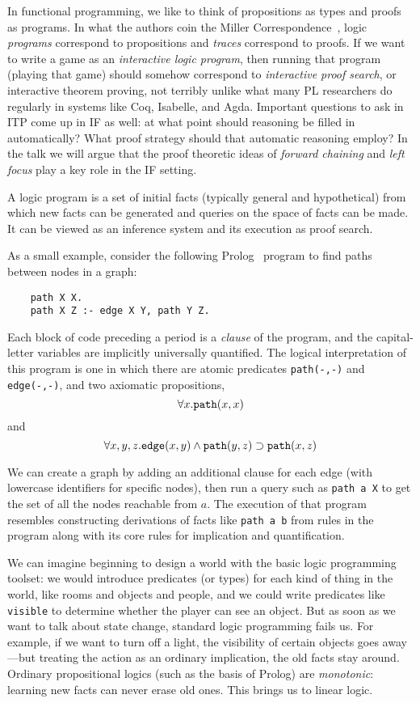 \renewcommand{\implies}{\supset}

In functional programming, we like to think of propositions as
types and proofs as programs. In what the authors coin the Miller
Correspondence~\cite{millertalk}, logic {\em programs} correspond to propositions
and {\em traces} correspond to proofs. If we want to write a game as an
{\em interactive logic program}, then running that program (playing that
game) should somehow correspond to {\em interactive proof search}, or
interactive theorem proving, not terribly unlike what many PL researchers
do regularly in systems like Coq, Isabelle, and Agda. Important questions
to ask in ITP come up in IF as well: at what point should reasoning be
filled in automatically? What proof strategy should that automatic
reasoning employ? In the talk we will argue that the proof theoretic
ideas of {\em forward chaining} and {\em left focus} play a key role in the
IF setting.

A logic program is a set of initial facts (typically general and
hypothetical) from which new facts can be generated and queries on the
space of facts can be made. It can be viewed as an inference system and its
execution as proof search.

As a small example, consider the following
Prolog~\cite{Covington:1996:PPD:230996} program to
find paths between nodes in a graph:

\begin{verbatim}
    path X X.
    path X Z :- edge X Y, path Y Z.
\end{verbatim}

\noindent
Each block of code preceding a period is a {\em clause} of the program, and
the capital-letter variables are implicitly universally quantified.
The logical interpretation of this program is one in which there are atomic
predicates \verb|path(-,-)| and \verb|edge(-,-)|, and two axiomatic
propositions, 
\[\forall x.\verb|path|(x, x)\] 
and 
\[\forall x,y,z.\verb|edge|(x, y) \land \verb|path|(y, z) \implies 
\verb|path|(x, z)\]

\noindent
We can create a graph by adding an additional clause for each edge (with
lowercase identifiers for specific nodes), then run a query such as
\verb|path a X| to get the  set of all the nodes reachable from $a$. The
execution of that program resembles constructing derivations of facts like
\verb|path a b| from rules in the program along with its core rules for
implication and quantification.

We can imagine beginning to design a world with the basic logic
programming toolset: we would introduce predicates (or types) for each kind of
thing in the world, like rooms and objects and people, and we could write
predicates like \verb|visible| to determine whether the player can see an
object. But as soon as we want to talk about state change, standard logic
programming fails us. For example, if we want to turn off a light, the
visibility of certain objects goes away---but treating the action as an
ordinary implication, the old facts stay around. Ordinary propositional
logics (such as the basis of Prolog) are {\em monotonic}: learning new facts
can never erase old ones. This brings us to linear logic.
